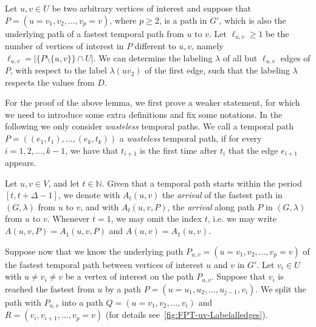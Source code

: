 \documentclass[a4paper,UKenglish,cleveref, autoref, thm-restate]{lipics-v2021}
\begin{document}
\begin{lemma}\label{lemma:FPT-uv-LabelAlmostalledges}
    Let $u, v \in U$ be two arbitrary vertices of interest and suppose that $P = (u=v_1, v_2, \dots, v_p = v)$, where $p \geq 2$, 
    is a path in $G'$, which is also the underlying path of a fastest temporal path from $u$ to $v$.
    Let $\ell_{u,v} \geq 1$ be the number of vertices of interest in $P$ different to $u,v$, namely $\ell_{u,v} = |\{P \setminus \{u,v \} \} \cap U |$.
    We can determine the labeling $\lambda$ of all but $\ell_{u,v}$ edges of $P$, with respect to the label $\lambda(uv_2)$ of the first edge,
    such that the labeling $\lambda$ respects the values from $D$.
\end{lemma}

For the proof of the above lemma, we first prove a weaker statement,
for which we need to introduce some extra definitions and fix some notations.
%
In the following
we only consider \emph{wasteless} temporal paths. 
We call 
a temporal path $P=((e_{1},t_{1}),\ldots ,(e_{k},t_{k}))$ a \emph{wasteless} temporal path, 
if for every $i=1,2,\ldots ,k-1$, we have that $t_{i+1}$ is the first time after $t_{i}$ that the edge $e_{i+1}$ appears. 

Let $u,v\in V$, and let $t\in \mathbb{N}$. 
Given that a temporal path starts within the period $[t,t+\Delta -1]$,
we denote with $A_{t}(u,v)$
the \emph{arrival} of the fastest path in $(G,\lambda )$ from $u$ to $v$, and
with $A_{t}(u,v,P)$,
the \emph{arrival} along path $P$ in $(G,\lambda )$ from $u$ to $v$.
%
Whenever $t=1$, we may omit the index $t$, i.e. we may write 
$A(u,v,P)=A_{1}(u,v,P)$ and $A(u,v)=A_{1}(u,v)$. 

Suppose now that 
we know the underlying path $P_{u,v} = (u=v_1, v_2, \dots, v_p = v)$ of the fastest temporal path between vertices of interest $u$ and $v$ in $G'$.
Let $v_i\in U$ with $u\neq v_i \neq v$ be a vertex of interest on the path $P_{u,v}$.
Suppose that $v_i$ is reached the fastest from $u$ by a path $P = (u = u_1, u_2, \dots, u_{j-1}, v_i)$.
We split the path with $P_{u,v}$ into a path $ Q = (u=v_1, v_2, \dots, v_i)$ and $R = (v_i, v_{i+1}, \dots, v_p=v)$
(for details see~\cref{fig:FPT-uv-Labelalledges}).
\end{document}
